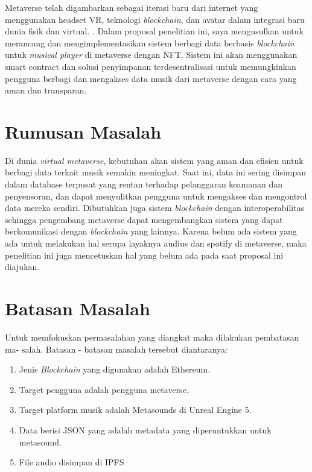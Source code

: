 Metaverse telah digambarkan sebagai iterasi baru dari internet yang menggunakan headset VR, teknologi \emph{blockchain},
dan avatar dalam integrasi baru dunia fisik dan virtual. \parencite{DWIVEDI2022102542}. Dalam proposal penelitian ini, saya mengusulkan
untuk merancang dan mengimplementasikan sistem berbagi data berbasis \emph{blockchain}
untuk \emph{musical player} di metaverse dengan NFT. Sistem ini akan menggunakan smart contract dan solusi penyimpanan terdesentralisasi
untuk memungkinkan pengguna berbagi dan mengakses data musik dari metaverse dengan cara yang aman dan transparan.

\section{Rumusan Masalah}

Di dunia \emph{virtual metaverse}, kebutuhan akan sistem yang aman dan efisien untuk berbagi data terkait musik semakin meningkat.
Saat ini, data ini sering disimpan dalam database terpusat yang rentan terhadap pelanggaran keamanan dan
penyensoran, dan dapat menyulitkan pengguna untuk mengakses dan mengontrol data mereka sendiri. Dibutuhkan juga sistem \emph{blockchain} dengan interoperabilitas sehingga
pengembang metaverse dapat mengembangkan sistem yang dapat berkomunikasi dengan \emph{blockchain} yang lainnya. Karena belum ada sistem yang ada untuk melakukan hal serupa layaknya audius dan spotify di metaverse,
maka penelitian ini juga mencetuskan hal yang belum ada pada saat proposal ini diajukan.

\section{Batasan Masalah}

Untuk memfokuskan permasalahan yang diangkat maka dilakukan pembatasan ma-
salah. Batasan - batasan masalah tersebut diantaranya:
\begin{enumerate}
  \item Jenis \emph{Blockchain} yang digunakan adalah Ethereum.
  \item Target pengguna adalah pengguna metaverse.
  \item Target platform musik adalah Metasounds di Unreal Engine 5.
  \item Data berisi JSON yang adalah metadata yang diperuntukkan untuk metasound.
  \item File audio disimpan di IPFS
\end{enumerate}

